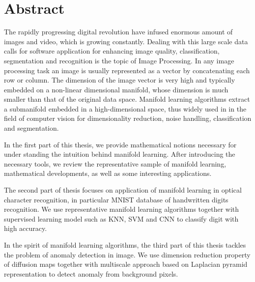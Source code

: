 {\chapter*{Abstract}}

The rapidly progressing digital revolution have infused enormous amount of images and video, which is growing constantly. Dealing with this large scale data calls for software application for enhancing image quality, classification, segmentation and recognition is the topic of Image Processing. In any image processing task an image is usually represented as a vector by concatenating each row or column. The dimension of the image vector is very high and typically embedded on a non-linear dimensional manifold, whose dimension is much smaller than that of the original data space. Manifold learning algorithms extract a submanifold embedded in a high-dimensional space, thus widely used in in the field of computer vision for dimensionality reduction, noise handling, classification and segmentation. 

In the first part of this thesis, we provide mathematical notions necessary for under standing the intuition behind manifold learning. After introducing the necessary tools, we review the representative sample of manifold learning, mathematical developments, as well as some interesting applications.

The second part of thesis focuses on application of manifold learning in optical character recognition, in particular MNIST database of handwritten digits recognition. We use representative manifold learning algorithms together with supervised learning model such as KNN, SVM and CNN to classify digit with high accuracy.

In the spirit of manifold learning algorithms, the third part of this thesis tackles the problem of anomaly detection in image. We use dimension reduction property of diffusion maps together with multiscale approach based on Laplacian pyramid representation to detect anomaly from background pixels.


